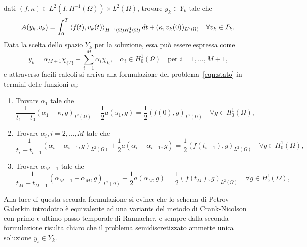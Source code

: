 dati $(f,\kappa)\in L^2(I,H^{-1}(\Omega))\times L^2(\Omega)$, trovare $y_k\in Y_k$ tale che 
\begin{equation}
\label{eqn:stato}
A(y_k,v_k)=\int^{T}_{0} \Braket{f(t),v_k(t)}_{H^{-1}(\Omega)H^1_0(\Omega)}dt + (\kappa,v_k(0))_{L^2(\Omega)}\quad \forall v_k\in P_k.
\end{equation}
Data la scelta dello spazio $Y_k$ per la soluzione, essa può essere espressa come 
\[
y_k=\alpha_{M+1}\chi_{\{T\}} + \sum^M_{i=1} \alpha_i\chi_{I_i},\quad \alpha_i\in H^1_0(\Omega)\quad\text{per $i=1,\dots,M+1$},
\]
e attraverso facili calcoli si arriva alla formulazione del problema~\eqref{eqn:stato} in termini delle funzioni $\alpha_i$:
\begin{enumerate}
\item Trovare $\alpha_1$ tale che
\begin{equation}
\label{eqn:stato1}
\frac{1}{t_1-t_0}(\alpha_1-\kappa,g)_{L^2(\Omega)} + \frac{1}{2}a(\alpha_1,g)=\frac{1}{2}(f(0),g)_{L^2(\Omega)}\quad \forall g\in H^1_0(\Omega),
\end{equation}
\item Trovare $\alpha_i,i=2,\dots,M$ tale che 
\begin{equation}
\label{eqn:stato2}
 \frac{1}{t_i-t_{i-1}}(\alpha_i-\alpha_{i-1},g)_{L^2(\Omega)} + \frac{1}{2}a(\alpha_i+\alpha_{i+1},g)=\frac{1}{2}(f(t_{i-1}),g)_{L^2(\Omega)}\quad \forall g\in H^1_0(\Omega),
 \end{equation}
 \item Trovare $\alpha_{M+1}$ tale che 
\begin{equation}
\label{eqn:stato1}
\frac{1}{t_{M}-t_{M-1}}(\alpha_{M+1}-\alpha_M,g)_{L^2(\Omega)} + \frac{1}{2}a(\alpha_M,g)=\frac{1}{2}(f(t_{M}),g)_{L^2(\Omega)}\quad \forall g\in H^1_0(\Omega),
\end{equation}
\end{enumerate}
Alla luce di questa seconda formulazione si evince che lo schema di Petrov-Galerkin introdotto è equivalente ad una variante del metodo di Crank-Nicolson con primo e ultimo passo temporale di Rannacher, e sempre dalla seconda formulazione risulta chiaro che il problema semidiscretizzato ammette unica soluzione $y_k\in Y_k$.

